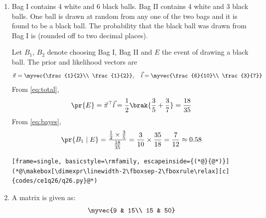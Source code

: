 \begin{enumerate}[label=\thesubsection.\arabic*, ref=\thesubsection.\theenumi, itemsep=0pt, leftmargin=*]
\item Bag I contains 4 white and 6 black balls. Bag II contains 4 white and 3 black balls. One ball is drawn at random from any one of the two bags and it is found to be a black ball. The probability that the black ball was drawn from Bag I is \underline{\hspace{2cm}} (rounded off to two decimal places). \gate

\solution Let $B_1$, $B_2$ denote choosing Bag I, Bag II and $E$ the event of drawing a black ball. The prior and likelihood vectors are
\begin{align}
\vec{\pi} = \myvec{\frac{1}{2}\\ \frac{1}{2}},\quad \vec{l} = \myvec{\frac{6}{10}\\ \frac{3}{7}}
\end{align}
From \eqref{eq:total},
\begin{align}
\pr{E} = \vec{\pi}^\top\vec{l} = \frac{1}{2}\brak{\frac{3}{5} + \frac{3}{7}} = \frac{18}{35}
\end{align}
From \eqref{eq:bayes},
\begin{align}
\pr{B_1\mid E} = \frac{\frac{1}{2}\times\frac{3}{5}}{\frac{18}{35}} = \frac{3}{10}\times\frac{35}{18} = \frac{7}{12} \approx 0.58
\end{align}
\begin{lstlisting}[frame=single, basicstyle=\rmfamily, escapeinside={(*@}{@*)}]
(*@\makebox[\dimexpr\linewidth-2\fboxsep-2\fboxrule\relax][c]{codes/ce1q26/q26.py}@*)
\end{lstlisting}

\item A matrix is given as:
\begin{align}
\myvec{9 & 15\\ 15 & 50}
\end{align}


\end{enumerate}
